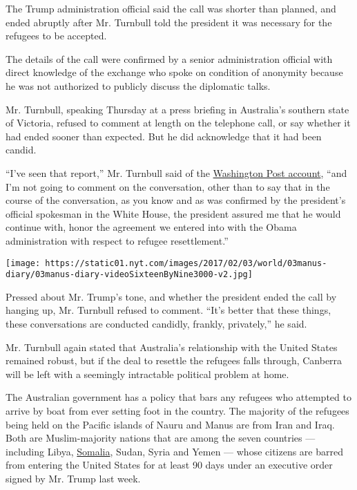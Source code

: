 The Trump administration official said the call was shorter than
planned, and ended abruptly after Mr. Turnbull told the president it was
necessary for the refugees to be accepted.

The details of the call were confirmed by a senior administration
official with direct knowledge of the exchange who spoke on condition of
anonymity because he was not authorized to publicly discuss the
diplomatic talks.

Mr. Turnbull, speaking Thursday at a press briefing in Australia's
southern state of Victoria, refused to comment at length on the
telephone call, or say whether it had ended sooner than expected. But he
did acknowledge that it had been candid.

``I've seen that report,'' Mr. Turnbull said of the
\href{https://www.washingtonpost.com/world/national-security/no-gday-mate-on-call-with-australian-pm-trump-badgers-and-brags/2017/02/01/88a3bfb0-e8bf-11e6-80c2-30e57e57e05d_story.html?utm_term=.a6b6fc6bea02}{Washington
Post account}, ``and I'm not going to comment on the conversation, other
than to say that in the course of the conversation, as you know and as
was confirmed by the president's official spokesman in the White House,
the president assured me that he would continue with, honor the
agreement we entered into with the Obama administration with respect to
refugee resettlement.''

\texttt{[image: https://static01.nyt.com/images/2017/02/03/world/03manus-diary/03manus-diary-videoSixteenByNine3000-v2.jpg]}

Pressed about Mr. Trump's tone, and whether the president ended the call
by hanging up, Mr. Turnbull refused to comment. ``It's better that these
things, these conversations are conducted candidly, frankly,
privately,'' he said.

Mr. Turnbull again stated that Australia's relationship with the United
States remained robust, but if the deal to resettle the refugees falls
through, Canberra will be left with a seemingly intractable political
problem at home.

The Australian government has a policy that bars any refugees who
attempted to arrive by boat from ever setting foot in the country. The
majority of the refugees being held on the Pacific islands of Nauru and
Manus are from Iran and Iraq. Both are Muslim-majority nations that are
among the seven countries --- including Libya,
\href{http://topics.nytimes.com/top/news/international/countriesandterritories/somalia/index.html?inline=nyt-geo}{Somalia},
Sudan, Syria and Yemen --- whose citizens are barred from entering the
United States for at least 90 days under an executive order signed by
Mr. Trump last week.

